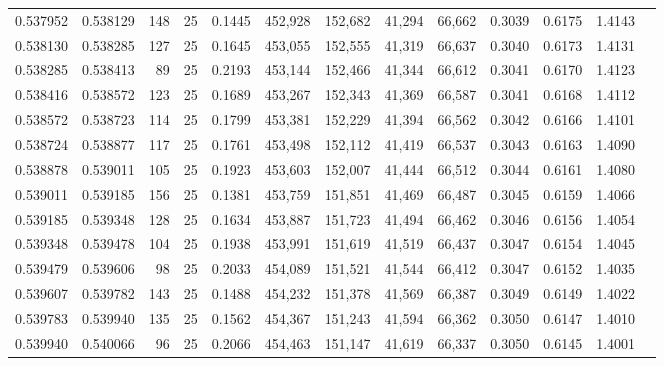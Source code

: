 \begin{tabular}{rrrrrrrrrrrrr}
0.537952 & 0.538129 &   148 &  25 &                                     0.1445 & 452,928 & 152,682 &  41,294 &  66,662 & 0.3039 & 0.6175 & 1.4143 \\
0.538130 & 0.538285 &   127 &  25 &                                     0.1645 & 453,055 & 152,555 &  41,319 &  66,637 & 0.3040 & 0.6173 & 1.4131 \\
0.538285 & 0.538413 &    89 &  25 &                                     0.2193 & 453,144 & 152,466 &  41,344 &  66,612 & 0.3041 & 0.6170 & 1.4123 \\
0.538416 & 0.538572 &   123 &  25 &                                     0.1689 & 453,267 & 152,343 &  41,369 &  66,587 & 0.3041 & 0.6168 & 1.4112 \\
0.538572 & 0.538723 &   114 &  25 &                                     0.1799 & 453,381 & 152,229 &  41,394 &  66,562 & 0.3042 & 0.6166 & 1.4101 \\
0.538724 & 0.538877 &   117 &  25 &                                     0.1761 & 453,498 & 152,112 &  41,419 &  66,537 & 0.3043 & 0.6163 & 1.4090 \\
0.538878 & 0.539011 &   105 &  25 &                                     0.1923 & 453,603 & 152,007 &  41,444 &  66,512 & 0.3044 & 0.6161 & 1.4080 \\
0.539011 & 0.539185 &   156 &  25 &                                     0.1381 & 453,759 & 151,851 &  41,469 &  66,487 & 0.3045 & 0.6159 & 1.4066 \\
0.539185 & 0.539348 &   128 &  25 &                                     0.1634 & 453,887 & 151,723 &  41,494 &  66,462 & 0.3046 & 0.6156 & 1.4054 \\
0.539348 & 0.539478 &   104 &  25 &                                     0.1938 & 453,991 & 151,619 &  41,519 &  66,437 & 0.3047 & 0.6154 & 1.4045 \\
0.539479 & 0.539606 &    98 &  25 &                                     0.2033 & 454,089 & 151,521 &  41,544 &  66,412 & 0.3047 & 0.6152 & 1.4035 \\
0.539607 & 0.539782 &   143 &  25 &                                     0.1488 & 454,232 & 151,378 &  41,569 &  66,387 & 0.3049 & 0.6149 & 1.4022 \\
0.539783 & 0.539940 &   135 &  25 &                                     0.1562 & 454,367 & 151,243 &  41,594 &  66,362 & 0.3050 & 0.6147 & 1.4010 \\
0.539940 & 0.540066 &    96 &  25 &                                     0.2066 & 454,463 & 151,147 &  41,619 &  66,337 & 0.3050 & 0.6145 & 1.4001 \\

\end{tabular}
